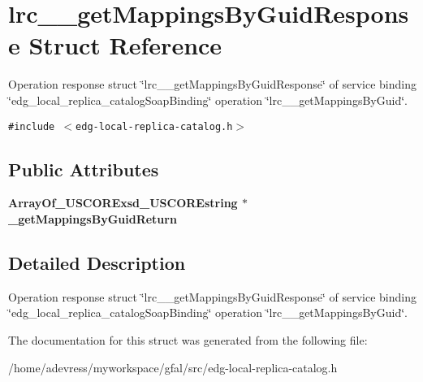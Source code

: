 \section{lrc\_\-\_\-get\-Mappings\-By\-Guid\-Response Struct Reference}
\label{structlrc____getMappingsByGuidResponse}
Operation response struct \char`\"{}lrc\_\-\_\-get\-Mappings\-By\-Guid\-Response\char`\"{} of service binding \char`\"{}edg\_\-local\_\-replica\_\-catalog\-Soap\-Binding\char`\"{} operation \char`\"{}lrc\_\-\_\-get\-Mappings\-By\-Guid\char`\"{}.  


{\tt \#include $<$edg-local-replica-catalog.h$>$}

\subsection*{Public Attributes}
\begin{CompactItemize}
\item 
\bf{Array\-Of\_\-USCORExsd\_\-USCOREstring} $\ast$ \textbf{\_\-get\-Mappings\-By\-Guid\-Return}\label{structlrc____getMappingsByGuidResponse_f90e22a9987e1a9b6e77a67a0a4d529c}

\end{CompactItemize}


\subsection{Detailed Description}
Operation response struct \char`\"{}lrc\_\-\_\-get\-Mappings\-By\-Guid\-Response\char`\"{} of service binding \char`\"{}edg\_\-local\_\-replica\_\-catalog\-Soap\-Binding\char`\"{} operation \char`\"{}lrc\_\-\_\-get\-Mappings\-By\-Guid\char`\"{}. 



The documentation for this struct was generated from the following file:\begin{CompactItemize}
\item 
/home/adevress/myworkspace/gfal/src/edg-local-replica-catalog.h\end{CompactItemize}
